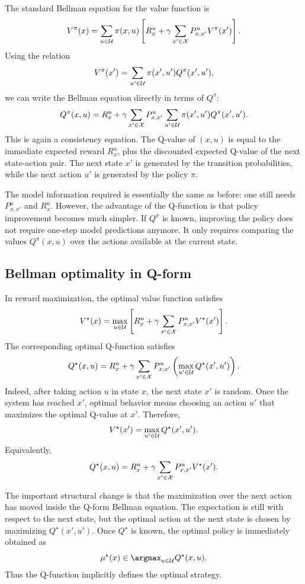 The standard Bellman equation for the value function is
\[
V^\pi(x)
=
\sum_{u\in\mathcal{U}}\pi(x,u)
\left[
R_x^u
+
\gamma\sum_{x'\in\mathcal{X}}P^u_{x,x'}V^\pi(x')
\right].
\]
Using the relation
\[
V^\pi(x')
=
\sum_{u'\in\mathcal{U}}\pi(x',u')Q^\pi(x',u'),
\]
we can write the Bellman equation directly in terms of \(Q^\pi\):
\[
Q^\pi(x,u)
=
R_x^u
+
\gamma\sum_{x'\in\mathcal{X}}P^u_{x,x'}
\sum_{u'\in\mathcal{U}}\pi(x',u')Q^\pi(x',u').
\]
This is again a consistency equation. The Q-value of \((x,u)\) is equal to the immediate
expected reward \(R_x^u\), plus the discounted expected Q-value of the next state-action pair.
The next state \(x'\) is generated by the transition probabilities, while the next action \(u'\)
is generated by the policy \(\pi\).

The model information required is essentially the same as before: one still needs
\(P^u_{x,x'}\) and \(R_x^u\). However, the advantage of the Q-function is that policy
improvement becomes much simpler. If \(Q^\pi\) is known, improving the policy does not require
one-step model predictions anymore. It only requires comparing the values \(Q^\pi(x,u)\) over
the actions available at the current state.

\subsection{Bellman optimality in Q-form}

In reward maximization, the optimal value function satisfies
\[
V^\star(x)
=
\max_{u\in\mathcal{U}}
\left[
R_x^u
+
\gamma\sum_{x'\in\mathcal{X}}P^u_{x,x'}V^\star(x')
\right].
\]
The corresponding optimal Q-function satisfies
\[
Q^\star(x,u)
=
R_x^u
+
\gamma\sum_{x'\in\mathcal{X}}P^u_{x,x'}
\left(
\max_{u'\in\mathcal{U}}Q^\star(x',u')
\right).
\]
Indeed, after taking action \(u\) in state \(x\), the next state \(x'\) is random. Once the system
has reached \(x'\), optimal behavior means choosing an action \(u'\) that maximizes the
optimal Q-value at \(x'\). Therefore,
\[
V^\star(x')
=
\max_{u'\in\mathcal{U}}Q^\star(x',u').
\]
Equivalently,
\[
Q^\star(x,u)
=
R_x^u
+
\gamma\sum_{x'\in\mathcal{X}}P^u_{x,x'}V^\star(x').
\]

The important structural change is that the maximization over the next action has moved
inside the Q-form Bellman equation. The expectation is still with respect to the next state, but
the optimal action at the next state is chosen by maximizing \(Q^\star(x',u')\). Once
\(Q^\star\) is known, the optimal policy is immediately obtained as
\[
\mu^\star(x)
\in
\argmax_{u\in\cU}Q^\star(x,u).
\]
Thus the Q-function implicitly defines the optimal strategy.

